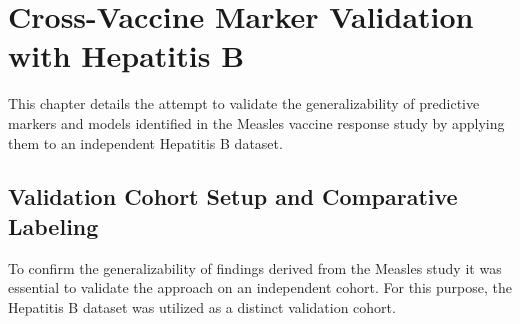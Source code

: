 \documentclass[12pt,a4paper]{report}
\newcommand{\todo}[1]{%
  \par\noindent%
  \begin{tcolorbox}[colback=yellow, colframe=black, boxrule=0.5pt, sharp corners, width=\linewidth, before skip=5pt, after skip=5pt]
    \textbf{TODO:} #1
  \end{tcolorbox}%
  \par
}
\begin{document}









\chapter{Cross-Vaccine Marker Validation with Hepatitis B}


\noindent
This chapter details the attempt to validate the generalizability of predictive markers and models identified in the Measles vaccine response study by applying them to an independent Hepatitis B dataset.

\section{Validation Cohort Setup and Comparative Labeling}
\noindent
To confirm the generalizability of findings derived from the Measles study it was essential to validate the approach on an independent cohort. For this purpose, the Hepatitis B dataset was utilized as a distinct validation cohort.\\
\end{document}
